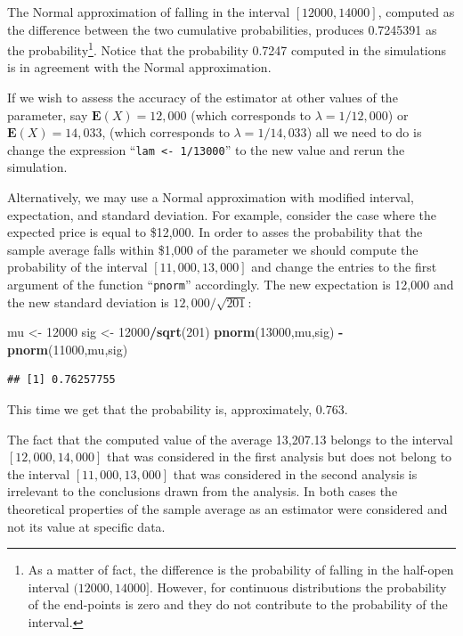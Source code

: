 \documentclass[]{krantz}
\makeatletter
\newenvironment{Shaded}{\begin{snugshade}}{\end{snugshade}}
\newcommand{\DecValTok}[1]{\textcolor[rgb]{0.00,0.00,0.81}{#1}}
\newcommand{\KeywordTok}[1]{\textcolor[rgb]{0.13,0.29,0.53}{\textbf{#1}}}
\newcommand{\NormalTok}[1]{#1}
\newcommand{\OperatorTok}[1]{\textcolor[rgb]{0.81,0.36,0.00}{\textbf{#1}}}
\newcommand{\StringTok}[1]{\textcolor[rgb]{0.31,0.60,0.02}{#1}}
\newcommand{\Expec}{\mathbf{E}}
\newenvironment{kframe}{%
\medskip{}
\setlength{\fboxsep}{.8em}
 \def\at@end@of@kframe{}%
 \ifinner\ifhmode%
  \def\at@end@of@kframe{\end{minipage}}%
  \begin{minipage}{\columnwidth}%
 \fi\fi%
 \def\FrameCommand##1{\hskip\@totalleftmargin \hskip-\fboxsep
 \colorbox{shadecolor}{##1}\hskip-\fboxsep
     \hskip-\linewidth \hskip-\@totalleftmargin \hskip\columnwidth}%
 \MakeFramed {\advance\hsize-\width
   \@totalleftmargin\z@ \linewidth\hsize
   \@setminipage}}%
 {\par\unskip\endMakeFramed%
 \at@end@of@kframe}
\renewenvironment{Shaded}{\begin{kframe}}{\end{kframe}}
\theoremstyle{definition}
\theoremstyle{definition}
\theoremstyle{definition}
\theoremstyle{remark}
\makeatother
\begin{document}
The Normal approximation of falling in the interval \([12000, 14000]\),
computed as the difference between the two cumulative probabilities,
produces 0.7245391 as the probability\footnote{As a matter of fact, the difference is the probability of falling
  in the half-open interval \((12000,14000]\). However, for continuous
  distributions the probability of the end-points is zero and they do
  not contribute to the probability of the interval.}. Notice that the probability
0.7247 computed in the simulations is in agreement with the Normal
approximation.

If we wish to assess the accuracy of the estimator at other values of
the parameter, say \(\Expec(X) = 12,000\) (which corresponds to
\(\lambda = 1/12,000\)) or \(\Expec(X) = 14,033\), (which corresponds to
\(\lambda = 1/14,033\)) all we need to do is change the expression
``\texttt{lam\ \textless{}-\ 1/13000}'' to the new value and rerun the simulation.

Alternatively, we may use a Normal approximation with modified interval,
expectation, and standard deviation. For example, consider the case
where the expected price is equal to \$12,000. In order to asses the
probability that the sample average falls within \$1,000 of the
parameter we should compute the probability of the interval
\([11,000, 13,000]\) and change the entries to the first argument of the
function ``\texttt{pnorm}'' accordingly. The new expectation is 12,000 and the
new standard deviation is \(12,000/\sqrt{201}\):

\begin{Shaded}
\begin{Highlighting}[]
\NormalTok{mu <-}\StringTok{ }\DecValTok{12000}
\NormalTok{sig <-}\StringTok{ }\DecValTok{12000}\OperatorTok{/}\KeywordTok{sqrt}\NormalTok{(}\DecValTok{201}\NormalTok{)}
\KeywordTok{pnorm}\NormalTok{(}\DecValTok{13000}\NormalTok{,mu,sig) }\OperatorTok{-}\StringTok{ }\KeywordTok{pnorm}\NormalTok{(}\DecValTok{11000}\NormalTok{,mu,sig)}
\end{Highlighting}
\end{Shaded}

\begin{verbatim}
## [1] 0.76257755
\end{verbatim}

This time we get that the probability is, approximately, 0.763.

The fact that the computed value of the average 13,207.13 belongs to the
interval \([12,000, 14,000]\) that was considered in the first analysis
but does not belong to the interval \([11,000, 13,000]\) that was
considered in the second analysis is irrelevant to the conclusions drawn
from the analysis. In both cases the theoretical properties of the
sample average as an estimator were considered and not its value at
specific data.
\end{document}
